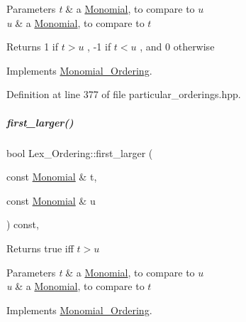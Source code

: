 \begin{DoxyParams}{Parameters}
{\em t} & a \hyperlink{group__polygroup_class_monomial}{Monomial}, to compare to $ u $ \\
\hline
{\em u} & a \hyperlink{group__polygroup_class_monomial}{Monomial}, to compare to $ t $ \\
\hline
\end{DoxyParams}
\begin{DoxyReturn}{Returns}
1 if $ t>u $ , -\/1 if $ t < u $ , and 0 otherwise 
\end{DoxyReturn}


Implements \hyperlink{group__orderinggroup_a9bc3155fc98b4d40c26118fa2114b827}{Monomial\+\_\+\+Ordering}.



Definition at line 377 of file particular\+\_\+orderings.\+hpp.

\mbox{\label{group__orderinggroup_acf085490051fdbbdde6e89831e3f0eda}} 
\subparagraph{\texorpdfstring{first\+\_\+larger()}{first\_larger()}}
{\footnotesize\ttfamily bool Lex\+\_\+\+Ordering\+::first\+\_\+larger (\begin{DoxyParamCaption}\item[{const \hyperlink{group__polygroup_class_monomial}{Monomial} \&}]{t,  }\item[{const \hyperlink{group__polygroup_class_monomial}{Monomial} \&}]{u }\end{DoxyParamCaption}) const\hspace{0.3cm}{\ttfamily [override]}, {\ttfamily [virtual]}}

\begin{DoxyReturn}{Returns}
{\ttfamily true} iff $t>u$ 
\end{DoxyReturn}

\begin{DoxyParams}{Parameters}
{\em t} & a \hyperlink{group__polygroup_class_monomial}{Monomial}, to compare to $ u $ \\
\hline
{\em u} & a \hyperlink{group__polygroup_class_monomial}{Monomial}, to compare to $ t $ \\
\hline
\end{DoxyParams}


Implements \hyperlink{group__orderinggroup_aed41fe82e1ca5cd287a93d287fee7c20}{Monomial\+\_\+\+Ordering}.



